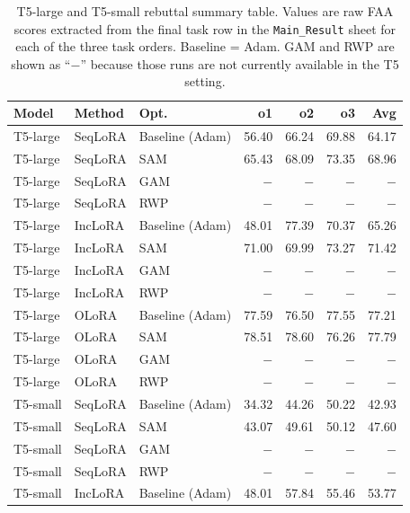 
\begin{table}[ht]
\centering
\caption{%
  T5-large and T5-small rebuttal summary table.
  Values are raw FAA scores extracted from the final task row in the
  \texttt{Main\_Result} sheet for each of the three task orders.
  Baseline = Adam. GAM and RWP are shown as ``$-$'' because those runs are not
  currently available in the T5 setting.
}
\label{tab:rebuttal_nlp_t5}
\setlength{\tabcolsep}{4.0pt}
\renewcommand{\arraystretch}{0.92}
\scriptsize
\begin{tabular}{@{}l l l r r r r@{}}
\toprule
\textbf{Model} & \textbf{Method} & \textbf{Opt.} & \textbf{o1} & \textbf{o2} & \textbf{o3} & \textbf{Avg} \\
\midrule
T5-large & SeqLoRA & Baseline (Adam) & 56.40 & 66.24 & 69.88 & 64.17 \\
T5-large & SeqLoRA & SAM & 65.43 & 68.09 & 73.35 & 68.96 \\
T5-large & SeqLoRA & GAM & $-$ & $-$ & $-$ & $-$ \\
T5-large & SeqLoRA & RWP & $-$ & $-$ & $-$ & $-$ \\
\addlinespace[2pt]
T5-large & IncLoRA & Baseline (Adam) & 48.01 & 77.39 & 70.37 & 65.26 \\
T5-large & IncLoRA & SAM & 71.00 & 69.99 & 73.27 & 71.42 \\
T5-large & IncLoRA & GAM & $-$ & $-$ & $-$ & $-$ \\
T5-large & IncLoRA & RWP & $-$ & $-$ & $-$ & $-$ \\
\addlinespace[2pt]
T5-large & OLoRA & Baseline (Adam) & 77.59 & 76.50 & 77.55 & 77.21 \\
T5-large & OLoRA & SAM & 78.51 & 78.60 & 76.26 & 77.79 \\
T5-large & OLoRA & GAM & $-$ & $-$ & $-$ & $-$ \\
T5-large & OLoRA & RWP & $-$ & $-$ & $-$ & $-$ \\
\addlinespace[3pt]
T5-small & SeqLoRA & Baseline (Adam) & 34.32 & 44.26 & 50.22 & 42.93 \\
T5-small & SeqLoRA & SAM & 43.07 & 49.61 & 50.12 & 47.60 \\
T5-small & SeqLoRA & GAM & $-$ & $-$ & $-$ & $-$ \\
T5-small & SeqLoRA & RWP & $-$ & $-$ & $-$ & $-$ \\
\addlinespace[2pt]
T5-small & IncLoRA & Baseline (Adam) & 48.01 & 57.84 & 55.46 & 53.77 \\

\end{tabular}
\end{table}
